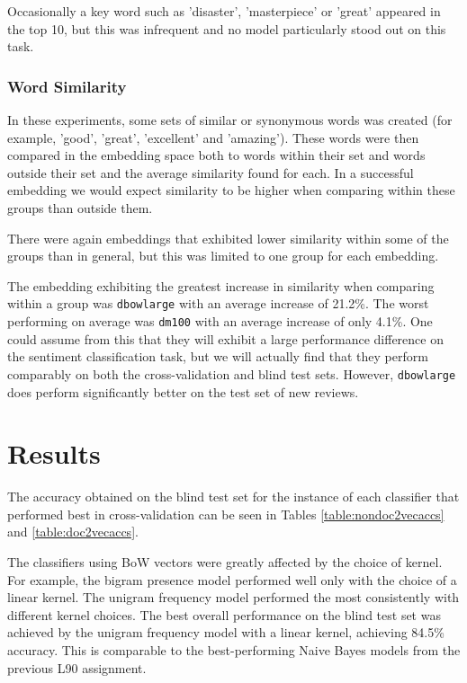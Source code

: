 \documentclass[twocolumn]{article}
\begin{document}
Occasionally a key word such as 'disaster', 'masterpiece' or 'great' appeared in the top 10, but this was infrequent and no model particularly stood out on this task.

\subsubsection{Word Similarity}

In these experiments, some sets of similar or synonymous words was created (for example, 'good', 'great', 'excellent' and 'amazing'). These words were then compared in the embedding space both to words within their set and words outside their set and the average similarity found for each. In a successful embedding we would expect similarity to be higher when comparing within these groups than outside them.

There were again embeddings that exhibited lower similarity within some of the groups than in general, but this was limited to one group for each embedding.

The embedding exhibiting the greatest increase in similarity when comparing within a group was \texttt{dbowlarge} with an average increase of 21.2\%. The worst performing on average was \texttt{dm100} with an average increase of only 4.1\%. One could assume from this that they will exhibit a large performance difference on the sentiment classification task, but we will actually find that they perform comparably on both the cross-validation and blind test sets. However, \texttt{dbowlarge} does perform significantly better on the test set of new reviews.


\section{Results}

The accuracy obtained on the blind test set for the instance of each classifier that performed best in cross-validation can be seen in Tables \ref{table:nondoc2vecaccs} and \ref{table:doc2vecaccs}.

The classifiers using BoW vectors were greatly affected by the choice of kernel. For example, the bigram presence model performed well only with the choice of a linear kernel. The unigram frequency model performed the most consistently with different kernel choices. The best overall performance on the blind test set was achieved by the unigram frequency model with a linear kernel, achieving 84.5\% accuracy. This is comparable to the best-performing Naive Bayes models from the previous L90 assignment.
\end{document}
